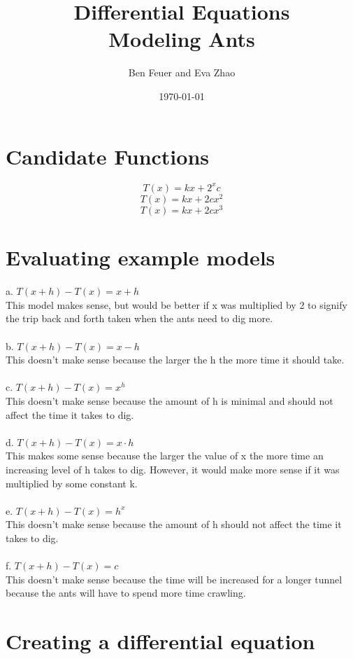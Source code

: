 \documentclass{report}
\title{\Huge{Differential Equations}\\Modeling Ants}
\author{\huge{Ben Feuer and Eva Zhao}}
\date{\today}
\begin{document}
\maketitle

\section*{Candidate Functions}

$$ T(x) = kx + 2^x c $$ 
$$ T(x) = kx + 2cx^2 $$
$$ T(x) = kx + 2cx^3 $$ 

\section*{Evaluating example models}
a. $ T(x + h) - T(x) = x + h $ \\
This model makes sense, but would be better if x was multiplied by 2 to signify the trip back and forth taken when the ants need to dig more. \\ \\
b. $ T(x + h) - T(x) = x - h $ \\
This doesn't make sense because the larger the h the more time it should take. \\ \\
c. $ T(x + h) - T(x) = x^h $ \\
This doesn't make sense because the amount of h is minimal and should not affect the time it takes to dig. \\ \\
d. $ T(x + h) - T(x) = x \cdot h $ \\
This makes some sense because the larger the value of x the more time an increasing level of h takes to dig. However, it would make more sense if it was multiplied by some constant k.\\ \\
e. $ T(x + h) - T(x) = h^x $ \\
This doesn't make sense because the amount of h should not affect the time it takes to dig. \\ \\
f. $ T(x + h) - T(x) = c $ \\
This doesn't make sense because the time will be increased for a longer tunnel because the ants will have to spend more time crawling. 

\section*{Creating a differential equation}
\end{document}
